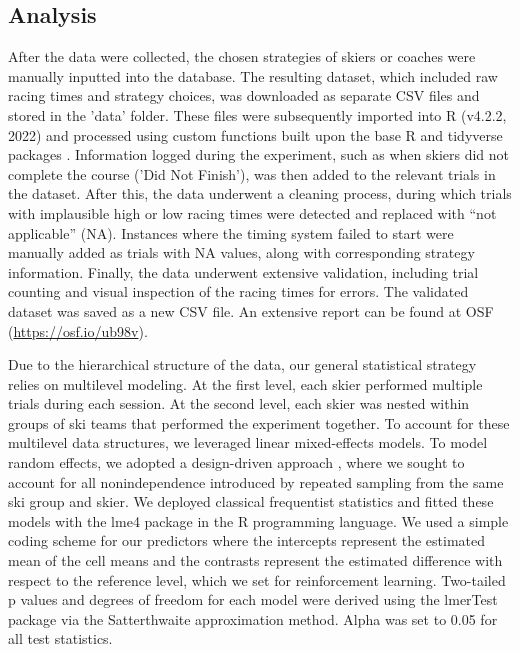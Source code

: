 \documentclass{article}
\begin{document}
\subsection{Analysis}

After the data were collected, the chosen strategies of skiers or coaches were manually inputted into the database. The resulting dataset, which included raw racing times and strategy choices, was downloaded as separate CSV files and stored in the 'data' folder. These files were subsequently imported into R (v4.2.2, 2022) and processed using custom functions built upon the base R and tidyverse\cite{wickham_package_2017} packages . Information logged during the experiment, such as when skiers did not complete the course ('Did Not Finish'), was then added to the relevant trials in the dataset. After this, the data underwent a cleaning process, during which trials with implausible high or low racing times were detected and replaced with “not applicable” (NA). Instances where the timing system failed to start were manually added as trials with NA values, along with corresponding strategy information. Finally, the data underwent extensive validation, including trial counting and visual inspection of the racing times for errors. The validated dataset was saved as a new CSV file. An extensive report can be found at OSF (\url{https://osf.io/ub98v}).

Due to the hierarchical structure of the data, our general statistical strategy relies on multilevel modeling. At the first level, each skier performed multiple trials during each session. At the second level, each skier was nested within groups of ski teams that performed the experiment together. To account for these multilevel data structures, we leveraged linear mixed-effects models. To model random effects, we adopted a design-driven approach \cite{barr_random_2013, barr_learning_2021}, where we sought to account for all nonindependence introduced by repeated sampling from the same ski group and skier. We deployed classical frequentist statistics and fitted these models with the lme4 package \cite{bates_fitting_2015} in the R programming language. We used a simple coding scheme for our predictors where the intercepts represent the estimated mean of the cell means and the contrasts represent the estimated difference with respect to the reference level, which we set for reinforcement learning. Two-tailed p values and degrees of freedom for each model were derived using the lmerTest package \cite{kuznetsova_lmertest_2017} via the Satterthwaite approximation method. Alpha was set to 0.05 for all test statistics.
\end{document}
